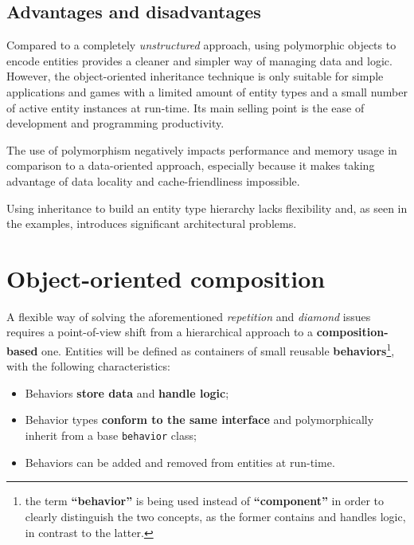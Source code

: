 \documentclass[twoside, 12pt, a4paper, openany]{book}
\begin{document}
\subsection{Advantages and
disadvantages}\label{advantages-and-disadvantages}

Compared to a completely \emph{unstructured} approach, using polymorphic
objects to encode entities provides a cleaner and simpler way of
managing data and logic. However, the object-oriented inheritance
technique is only suitable for simple applications and games with a
limited amount of entity types and a small number of active entity
instances at run-time. Its main selling point is the ease of development
and programming productivity.

The use of polymorphism negatively impacts performance and memory usage
in comparison to a data-oriented approach, especially because it makes
taking advantage of data locality and cache-friendliness impossible.

Using inheritance to build an entity type hierarchy lacks flexibility
and, as seen in the examples, introduces significant architectural
problems.

\section{Object-oriented composition}\label{object-oriented-composition}

A flexible way of solving the aforementioned \emph{repetition} and
\emph{diamond} issues requires a point-of-view shift from a hierarchical
approach to a \textbf{composition-based} one. Entities will be defined
as containers of small reusable \textbf{behaviors}\footnote{the term
  \textbf{``behavior''} is being used instead of \textbf{``component''}
  in order to clearly distinguish the two concepts, as the former
  contains and handles logic, in contrast to the latter.}, with the
following characteristics:

\begin{itemize}
\item
  Behaviors \textbf{store data} and \textbf{handle logic};
\item
  Behavior types \textbf{conform to the same interface} and
  polymorphically inherit from a base
  \texttt{behavior}
  class;
\item
  Behaviors can be added and removed from entities at run-time.
\end{itemize}
\end{document}

